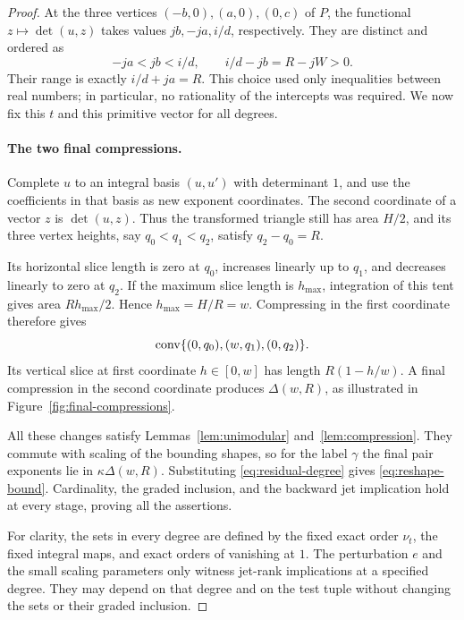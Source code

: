 \begin{proof}
At the three vertices $(-b,0),(a,0),(0,c)$ of $P$, the functional
$z\mapsto\det(u,z)$ takes values $jb,-ja,i/d$, respectively.  They are
distinct and ordered as
\begin{equation}\label{eq:vertex-heights}
 -ja<jb<i/d,
 \qquad i/d-jb=R-jW>0.
\end{equation}
Their range is exactly $i/d+ja=R$.  This choice used only inequalities
between real numbers; in particular, no rationality of the intercepts was
required.  We now fix this $t$ and this primitive vector for all degrees.

\paragraph{The two final compressions.}
Complete $u$ to an integral basis $(u,u')$ with determinant $1$, and use
the coefficients in that basis as new exponent coordinates.  The second
coordinate of a vector $z$ is $\det(u,z)$.  Thus the transformed triangle
still has area $H/2$, and its three vertex heights, say
$q_0<q_1<q_2$, satisfy $q_2-q_0=R$.

Its horizontal slice length is zero at $q_0$, increases linearly up to
$q_1$, and decreases linearly to zero at $q_2$.  If the maximum slice
length is $h_{\max}$, integration of this tent gives area
$Rh_{\max}/2$.  Hence $h_{\max}=H/R=w$.  Compressing in the first
coordinate therefore gives
\begin{equation}\label{eq:tent-triangle}
 \operatorname{conv}\{(0,q_0),(w,q_1),(0,q_2)\}.
\end{equation}
Its vertical slice at first coordinate $h\in[0,w]$ has length
$R(1-h/w)$.  A final compression in the second coordinate produces
$\Delta(w,R)$, as illustrated in Figure~\ref{fig:final-compressions}.

\ReshapingCompressionFigure

All these changes satisfy Lemmas~\ref{lem:unimodular}
and~\ref{lem:compression}.  They commute with scaling of the bounding
shapes, so for the label $\gamma$ the final pair exponents lie in
$\kappa\Delta(w,R)$.  Substituting \eqref{eq:residual-degree} gives
\eqref{eq:reshape-bound}.  Cardinality, the graded inclusion, and the
backward jet implication hold at every stage, proving all the assertions.

For clarity, the sets in every degree are defined by the fixed exact order
$\nu_t$, the fixed integral maps, and exact orders of vanishing at $1$.
The perturbation $e$ and the small scaling parameters only witness
jet-rank implications at a specified degree.  They may depend on that
degree and on the test tuple without changing the sets or their graded
inclusion.
\end{proof}
